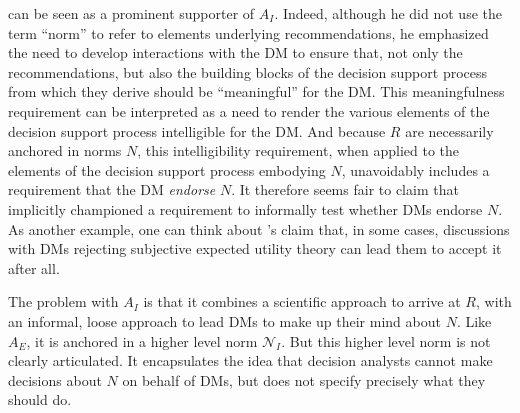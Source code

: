 \documentclass[preprint, french, english, 11pt, authoryear]{elsarticle}%
\begin{document}
\citet{roy_multicriteria_1996} can be seen as a prominent supporter of $A_I$. Indeed, although he did not use the term “norm” to refer to elements underlying recommendations, he emphasized the need to develop interactions with the \ac{DM} to ensure that, not only the recommendations, but also the building blocks of the decision support process from which they derive should be ``meaningful'' for the \ac{DM}.
This meaningfulness requirement can be interpreted as a need to render the various elements of the decision support process intelligible for the \ac{DM}.
And because $R$ are necessarily anchored in norms $N$, this intelligibility requirement, when applied to the elements of the decision support process embodying $N$, unavoidably includes a requirement that the \ac{DM} \emph{endorse} $N$. 
It therefore seems fair to claim that \citet{roy_multicriteria_1996} implicitly championed a requirement to informally test whether \acp{DM} endorse $N$. 
As another example, one can think about \citet{raiffa_back_1985}’s claim that, in some cases, discussions with \acp{DM} rejecting subjective expected utility theory can lead them to accept it after all.

The problem with $A_I$ is that it combines a scientific approach to arrive at $R$, with an informal, loose approach to lead \acp{DM} to make up their mind about $N$.
Like $A_E$, it is anchored in a higher level norm $\mathscr{N}_I$. But this higher level norm is not clearly articulated. It encapsulates the idea that decision analysts cannot make decisions about $N$ on behalf of \acp{DM}, but does not specify precisely what they should do.
\end{document}
